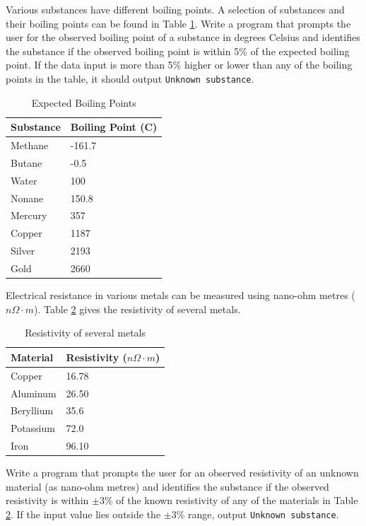 \begin{exer}

Various substances have different boiling points.  A selection of
substances and their boiling points can be found in Table \ref{table:boilingPoints}.
Write a program that prompts the user for the observed boiling point of
a substance in degrees Celsius and identifies the substance if the
observed boiling point is within 5\% of the expected boiling point.  If
the data input is more than 5\% higher or lower than any of the boiling
points in the table, it should output \texttt{Unknown substance}.

\begin{table}[h]
  \centering
  \begin{tabular}{ll}
    \textbf{Substance} & \textbf{Boiling Point (C)} \\
    \hline
    Methane & -161.7 \\
    Butane & -0.5 \\
    Water & 100 \\
    Nonane & 150.8 \\
    Mercury & 357 \\
    Copper & 1187 \\
    Silver & 2193 \\
    Gold & 2660 \\
    \hline
  \end{tabular}
\caption{Expected Boiling Points}
\label{table:boilingPoints}
\end{table}
\end{exer}

\begin{exer}
Electrical resistance in various metals can be measured using nano-ohm metres ($n\Omega\cdot m$).
Table \ref{table:resistivity} gives the resistivity of several metals.

\begin{table}[h]
\centering
\begin{tabular}{|l|l|}
\hline
Material & Resistivity ($n\Omega\cdot m$) \\
\hline\hline
Copper & 16.78 \\
\hline
Aluminum & 26.50\\
\hline
Beryllium & 35.6 \\
\hline
Potassium & 72.0 \\
\hline
Iron & 96.10 \\
\hline
\end{tabular}
\caption{Resistivity of several metals}
\label{table:resistivity}
\end{table}

Write a program that prompts the user for an observed resistivity of an unknown material (as nano-ohm metres)
and identifies the substance if the observed resistivity is within $\pm3\%$ of the known resistivity of any of the materials
in Table \ref{table:resistivity}.  If the input value lies outside the $\pm 3\%$ range, output \texttt{Unknown substance}.
\end{exer}

